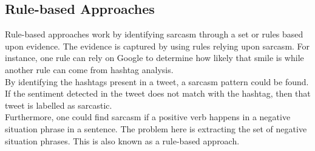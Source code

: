 \subsection{Rule-based Approaches~\cite{joshi2017automatic}}
Rule-based approaches work by identifying sarcasm through a set or rules based upon evidence. The evidence is captured by using rules relying upon sarcasm. For instance, one rule can rely on Google to determine how likely that smile is while another rule can come from hashtag analysis.\\ By identifying the hashtags present in a tweet, a sarcasm pattern could be found. If the sentiment detected in the tweet does not match with the hashtag, then that tweet is labelled as sarcastic.\\ Furthermore, one could find sarcasm if a positive verb happens in a negative situation phrase in a sentence. The problem here is extracting the set of negative situation phrases. This is also known as a rule-based approach.
